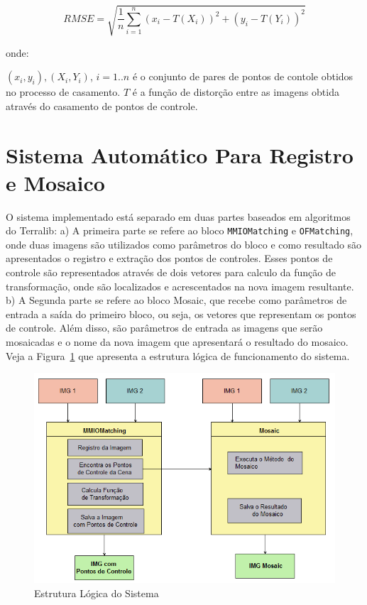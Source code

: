 \documentclass[9pt, a4paper, nofonttune, journal]{IEEEtran}
\begin{document}
$$
	RMSE = \sqrt{\frac{1}{n}\sum\limits_{i=1}^{n}(x_i - T(X_i))^2 + (y_i - T(Y_i))^2}
$$

onde:

$(x_i, y_i), (X_i, Y_i)$, $i = 1..n$ é o conjunto de pares de pontos de contole obtidos no processo de casamento.
$T$ é a função de distorção entre as imagens obtida através do casamento de pontos de controle.\cite{Fedorov1}

\section{ Sistema Automático Para Registro e Mosaico }
 
O sistema implementado está separado em duas partes baseados em algoritmos do Terralib: a) A primeira parte se refere ao bloco \texttt{MMIOMatching} e \texttt{OFMatching}, onde duas imagens são utilizados como parâmetros do bloco e como resultado são apresentados o registro e extração dos pontos de controles. Esses pontos de controle são representados através de dois vetores para calculo da função de transformação, onde são localizados e acrescentados na nova imagem resultante. b) A Segunda parte se refere ao bloco Mosaic, que recebe como parâmetros de entrada a saída do primeiro bloco, ou seja, os vetores  que representam os pontos de controle. Além disso, são parâmetros de entrada as imagens que serão mosaicadas e o nome da nova imagem que apresentará o resultado do mosaico. Veja a Figura~\ref{fig:estrutura_logica} que apresenta a estrutura lógica de funcionamento do sistema.

\begin{figure}[h!t]
\begin{center}
\includegraphics[scale=0.50]{figuras/estrutura_logica}
\caption{Estrutura Lógica do Sistema}
\label{fig:estrutura_logica}
\end{center} 
\end{figure}
\end{document}
